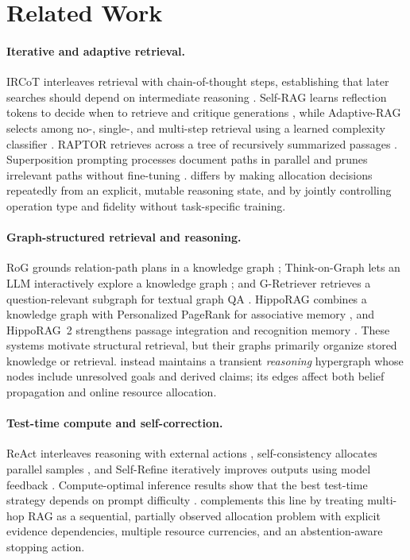 \section{Related Work}

\paragraph{Iterative and adaptive retrieval.}
IRCoT interleaves retrieval with chain-of-thought steps, establishing that later searches should depend on intermediate reasoning \citep{trivedi2023ircot}. Self-RAG learns reflection tokens to decide when to retrieve and critique generations \citep{asai2024selfrag}, while Adaptive-RAG selects among no-, single-, and multi-step retrieval using a learned complexity classifier \citep{jeong2024adaptiverag}. RAPTOR retrieves across a tree of recursively summarized passages \citep{sarthi2024raptor}. Superposition prompting processes document paths in parallel and prunes irrelevant paths without fine-tuning \citep{merth2024superposition}. \method{} differs by making allocation decisions repeatedly from an explicit, mutable reasoning state, and by jointly controlling operation type and fidelity without task-specific training.

\paragraph{Graph-structured retrieval and reasoning.}
RoG grounds relation-path plans in a knowledge graph \citep{luo2024rog}; Think-on-Graph lets an LLM interactively explore a knowledge graph \citep{sun2024think}; and G-Retriever retrieves a question-relevant subgraph for textual graph QA \citep{he2024gretriever}. HippoRAG combines a knowledge graph with Personalized PageRank for associative memory \citep{gutierrez2024hipporag}, and HippoRAG~2 strengthens passage integration and recognition memory \citep{gutierrez2025hipporag2}. These systems motivate structural retrieval, but their graphs primarily organize stored knowledge or retrieval. \method{} instead maintains a transient \emph{reasoning} hypergraph whose nodes include unresolved goals and derived claims; its edges affect both belief propagation and online resource allocation.

\paragraph{Test-time compute and self-correction.}
ReAct interleaves reasoning with external actions \citep{yao2023react}, self-consistency allocates parallel samples \citep{wang2023selfconsistency}, and Self-Refine iteratively improves outputs using model feedback \citep{madaan2023selfrefine}. Compute-optimal inference results show that the best test-time strategy depends on prompt difficulty \citep{snell2025scaling}. \method{} complements this line by treating multi-hop RAG as a sequential, partially observed allocation problem with explicit evidence dependencies, multiple resource currencies, and an abstention-aware stopping action.
